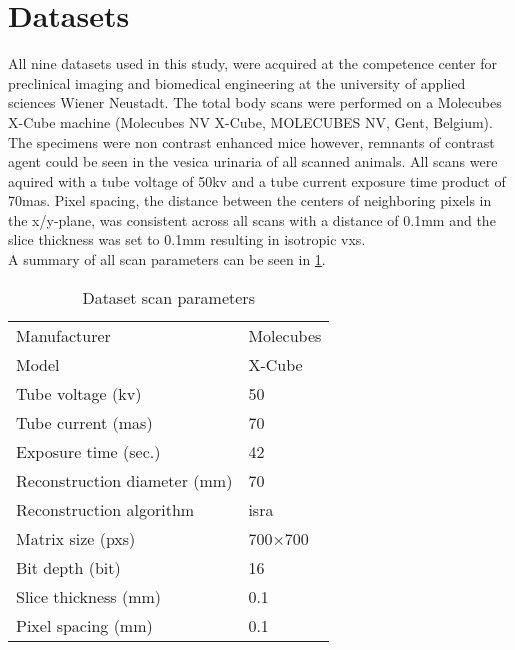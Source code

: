 \section{Datasets}\label{s:datasets}
All nine datasets used in this study, were acquired at the competence center for preclinical imaging and biomedical engineering at the university of applied sciences Wiener Neustadt.
The total body scans were performed on a Molecubes X-Cube \mct\space machine (Molecubes NV X-Cube, MOLECUBES NV, Gent, Belgium).
The specimens were non contrast enhanced mice however, remnants of contrast agent could be seen in the vesica urinaria of all scanned animals.
All scans were aquired with a tube voltage of 50\acrshort{kv} and a tube current exposure time product of 70\acrshort{mas}.
Pixel spacing, the distance between the centers of neighboring pixels in the x/y-plane, was consistent across all scans with a distance of 0.1mm and the slice thickness was set to 0.1mm resulting in isotropic \glspl{vx}.\\
A summary of all scan parameters can be seen in \cref{tab:scan-parameters}.\\
\begin{table}
	\begin{center}
		\begin{tabular}{l l}
			Manufacturer                  & Molecubes      \\
			Model                         & X-Cube         \\
			Tube voltage (\acrshort{kv})  & 50             \\
			Tube current (\acrshort{mas}) & 70             \\
			Exposure time (sec.)          & 42             \\
			Reconstruction diameter (mm)  & 70             \\
			Reconstruction algorithm      & \gls{isra}     \\
			Matrix size (\glspl{px})      & 700$\times$700 \\
			Bit depth (\gls{bit})         & 16             \\
			Slice thickness (mm)          & 0.1            \\
			Pixel spacing (mm)            & 0.1            \\
		\end{tabular}
		\caption{Dataset scan parameters}\label{tab:scan-parameters}
	\end{center}
\end{table}

